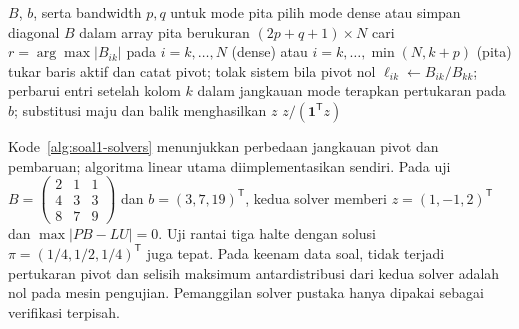 \begin{algorithm}[H]
\caption{Langkah utama LU dense dan eliminasi pita berpivot parsial}\label{alg:soal1-solvers}
\begin{algorithmic}[1]
\Require $B$, $b$, serta bandwidth $p,q$ untuk mode pita
\State pilih mode dense atau simpan diagonal $B$ dalam array pita berukuran $(2p+q+1)\times N$
  \State cari $r=\arg\max|B_{ik}|$ pada $i=k,\ldots,N$ (dense) atau $i=k,\ldots,\min(N,k+p)$ (pita)
  \State tukar baris aktif dan catat pivot; tolak sistem bila pivot nol
    \State $\ell_{ik}\gets B_{ik}/B_{kk}$; perbarui entri setelah kolom $k$ dalam jangkauan mode
  \EndFor
\EndFor
\State terapkan pertukaran pada $b$; substitusi maju dan balik menghasilkan $z$
\State \Return $z/(\mathbf1^\mathsf{T}z)$
\end{algorithmic}
\end{algorithm}
Kode~\ref{alg:soal1-solvers} menunjukkan perbedaan jangkauan pivot dan pembaruan; algoritma linear utama diimplementasikan sendiri. Pada uji $B=\left(\begin{smallmatrix}2&1&1\\4&3&3\\8&7&9\end{smallmatrix}\right)$ dan $b=(3,7,19)^\mathsf{T}$, kedua solver memberi $z=(1,-1,2)^\mathsf{T}$ dan $\max|PB-LU|=0$. Uji rantai tiga halte dengan solusi $\pi=(1/4,1/2,1/4)^\mathsf{T}$ juga tepat. Pada keenam data soal, tidak terjadi pertukaran pivot dan selisih maksimum antardistribusi dari kedua solver adalah nol pada mesin pengujian. Pemanggilan solver pustaka hanya dipakai sebagai verifikasi terpisah.

